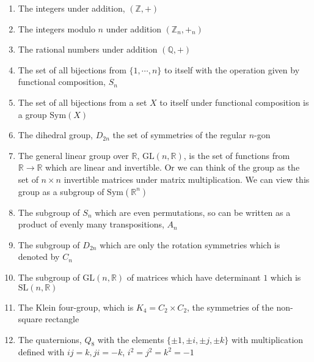 \documentclass{article}
\begin{document}
\begin{enumerate}
	\item The integers under addition, $ (\mathbb Z, +) $
	\item The integers modulo $ n $ under addition $ (\mathbb Z_n, +_n) $
	\item The rational numbers under addition $ (\mathbb Q, +) $
	\item The set of all bijections from $ \{1,\cdots,n\} $ to itself with the operation given by functional composition, $ S_n $
	\item The set of all bijections from a set $ X $ to itself under functional composition is a group $ \mathrm{Sym}(X) $
	\item The dihedral group, $ D_{2n} $ the set of symmetries of the regular $ n $-gon
\item The general linear group over $ \mathbb R $, $ \mathrm{GL}(n,\mathbb R) $, is the set of functions from $ \mathbb R\rightarrow \mathbb R $ which are linear and invertible. Or we can think of the group as the set of $ n\times n $ invertible matrices under matrix multiplication. We can view this group as a subgroup of $ \mathrm{Sym}(\mathbb R^n) $
\item The subgroup of $ S_n $ which are even permutations, so can be written as a product of evenly many transpositions, $ A_n $
\item The subgroup of $ D_{2n} $ which are only the rotation symmetries which is denoted by $ C_n $
\item The subgroup of $ \mathrm {GL}(n,\mathbb R) $ of matrices which have determinant $ 1 $ which is $ \mathrm {SL}(n,\mathbb R) $
\item The Klein four-group, which is $ K_4=C_2\times C_2 $, the symmetries of the non-square rectangle
\item The quaternions, $ Q_8 $ with the elements $ \{\pm 1, \pm i, \pm j, \pm k\} $ with multiplication defined with $ ij =k, ji = -k $, $ i^2=j^2=k^2=-1 $
\end{enumerate}
\end{document}

